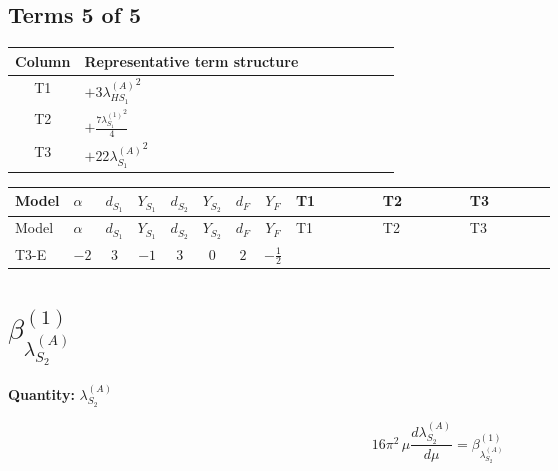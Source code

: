 \documentclass[8pt]{article}
\begin{document}
\begin{landscape}
\subsection*{Terms 5 of 5}
\begin{center}
\begin{tabular}{@{}c >{\raggedright\arraybackslash}p{0.82\linewidth}@{}}
\toprule
Column & Representative term structure \\
\midrule
T1 & \(\displaystyle +3 {\lambda_{HS_1}^{(A)}}^2\) \\
\midrule
T2 & \(\displaystyle +\frac{7 {\lambda_{S_1}^{(1)}}^2}{4}\) \\
\midrule
T3 & \(\displaystyle +22 {\lambda_{S_1}^{(A)}}^2\) \\
\midrule
\bottomrule
\end{tabular}
\end{center}
\smallskip
\tiny
\begin{longtable}{@{}llcccccc >{\raggedright\arraybackslash}p{0.21\linewidth} >{\raggedright\arraybackslash}p{0.21\linewidth} >{\raggedright\arraybackslash}p{0.21\linewidth}@{}}
\toprule
Model & $\alpha$ & $d_{S_1}$ & $Y_{S_1}$ & $d_{S_2}$ & $Y_{S_2}$ & $d_F$ & $Y_F$ & T1 & T2 & T3 \\
\midrule
\endfirsthead
\toprule
Model & $\alpha$ & $d_{S_1}$ & $Y_{S_1}$ & $d_{S_2}$ & $Y_{S_2}$ & $d_F$ & $Y_F$ & T1 & T2 & T3 \\
\midrule
\endhead
T3-E & $-2$ & $3$ & $-1$ & $3$ & $0$ & $2$ & $-\frac{1}{2}$ & \scriptsize\adjustbox{max width=\linewidth}{$\begin{gathered} +3 {\lambda_{HS_1}^{(A)}}^2\end{gathered}$} & \scriptsize\adjustbox{max width=\linewidth}{$\begin{gathered} +\frac{7 {\lambda_{S_1}^{(1)}}^2}{4}\end{gathered}$} & \scriptsize\adjustbox{max width=\linewidth}{$\begin{gathered} +22 {\lambda_{S_1}^{(A)}}^2\end{gathered}$} \\
\midrule
\bottomrule
\end{longtable}
\clearpage
\section*{$\beta_{\lambda_{S_2}^{(A)}}^{(1)}$}
\noindent\textbf{Quantity: }$\lambda_{S_2}^{(A)}$\par\smallskip
\[16\pi^2\,\mu\frac{d \lambda_{S_2}^{(A)}}{d\mu}=\beta_{\lambda_{S_2}^{(A)}}^{(1)}\]

\end{landscape}
\end{document}
